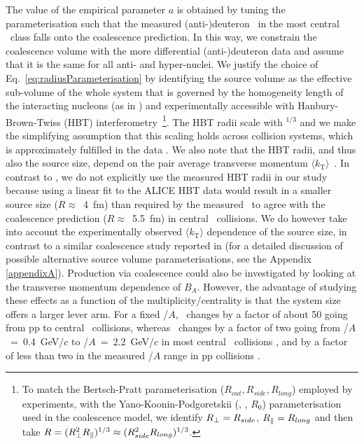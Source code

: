 \documentclass[%
 reprint,
 amsmath,amssymb,
 aps,
]{revtex4-1}
\begin{document}
The value of the empirical parameter $a$ is obtained by tuning the parameterisation such that the measured (anti-)deuteron \btwo~in the most central \PbPb~class falls onto the coalescence prediction. 
In this way, we constrain the coalescence volume with the more differential (anti-)deuteron data and assume that it is the same for all anti- and hyper-nuclei. 
We justify the choice of Eq.~\ref{eq:radiusParameterisation} by identifying the source volume as the effective sub-volume of the whole system that is governed by the homogeneity length of the interacting nucleons (as in \cite{Scheibl:1998tk}) and experimentally accessible with Hanbury-Brown-Twiss (HBT) interferometry~\footnote{To match the Bertsch-Pratt parameterisation ($R_{out}, R_{side}, R_{long}$) employed by experiments, with the Yano-Koonin-Podgoretskii (\rperp, \rpar, $R_{0}$) parameterisation used in the coalescence model,  we identify $R_{\perp} = R_{side}$, $R_{\|} = R_{long}$ and then take $R = (R_{\perp}^{2}R_{\|})^{1/3} \approx (R_{side}^{2}R_{long})^{1/3}$.}.
The HBT radii scale with \avdNdeta$^{1/3}$ and we make the simplifying assumption that this scaling holds across collision systems, which is approximately fulfilled in the data \cite{Adam:2015vna,Adam:2015pya}. 
We also note that the HBT radii, and thus also the source size, depend on the pair average transverse momentum $\langle k_{\mathrm{T}}\rangle$~\cite{Aamodt:2011mr}. 
In contrast to \cite{Blum:2017qnn}, we do not explicitly use the measured HBT radii in our study because using a linear fit to the ALICE HBT data \cite{Abelev:2012sq,Adam:2015vna} would result in a smaller source size ($R \approx$~4~fm) than required by the measured \btwo~to agree with the coalescence prediction ($R \approx$~5.5~fm) in central \PbPb~collisions.
We do however take into account the experimentally observed $\langle k_{\mathrm{T}}\rangle$ dependence of the source size, in contrast to a similar coalescence study reported in \cite{Sun:2018mqq} (for a detailed discussion of possible alternative source volume parameterisations, see the Appendix \ref{appendixA}). 
%
Production via coalescence could also be investigated by looking at the transverse momentum dependence of $B_{A}$. 
However, the advantage of studying these effects as a function of the multiplicity/centrality is that the system size offers a larger lever arm. 
For a fixed \pt/$A$, \btwo~changes by a factor of about 50 going from pp to central \PbPb~collisions, whereas \btwo~changes by a factor of two going from \pt/$A$~=~0.4~GeV/$c$ to \pt/$A$~=~2.2~GeV/$c$  in most central \PbPb~collisions \cite{ALICE:deuteronppPbPb2015}, and by a factor of less than two in the measured \pt/$A$ range in pp collisions \cite{ALICE:nucleipp2017, Acharya:2019rgc}.
\end{document}
